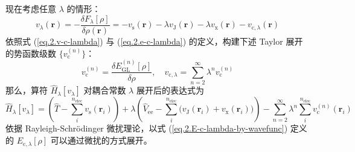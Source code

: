 现在考虑任意 $\lambda$ 的情形：
\begin{equation}
  v_{\lambda} (\bm{r}) = - \frac{\delta F_\lambda [\rho]}{\delta \rho(\bm{r})} = - v_\mathrm{s} (\bm{r}) - \lambda v_\mathrm{J}(\bm{r}) - \lambda v_\mathrm{x}(\bm{r}) - v_{\mathrm{c}, \lambda} (\bm{r})
\end{equation}
依照式 (\ref{eq.2.v-c-lambda}) 与 (\ref{eq.2.e-c-lambda}) 的定义，构建下述 Taylor 展开的势函数级数 $\{ v_\mathrm{c}^{(n)} \}$：
\begin{equation}
  v_\mathrm{c}^{(n)} = \frac{\delta E_\mathrm{GL}^{(n)} [\rho]}{\delta \rho}, \quad v_{\mathrm{c}, \lambda} = \sum_{n=2}^\infty \lambda^n v_\mathrm{c}^{(n)}
\end{equation}
那么，算符 $\hat H_\lambda [v_\lambda]$ 对耦合常数 $\lambda$ 展开后的表达式为
\begin{equation}
  \hat H_\lambda[v_\lambda] = \left( \hat T - \sum_i^{n_\mathrm{elec}} v_\mathrm{s} (\bm{r}_i) \right) + \lambda \left( \hat V_\mathrm{ee} - \sum_i^{n_\mathrm{elec}} \big( v_\mathrm{J} (\bm{r}_i) + v_\mathrm{x} (\bm{r}_i) \big) \right) - \sum_{n=2}^\infty \lambda^n \sum_{i}^{n_\mathrm{elec}} v_\mathrm{c}^{(n)} (\bm{r}_i)
\end{equation}
依据 Rayleigh-Schr\"odinger 微扰理论，以式 (\ref{eq.2.E-c-lambda-by-wavefunc}) 定义的 $E_{\mathrm{c}, \lambda} [\rho]$ 可以通过微扰的方式展开。

